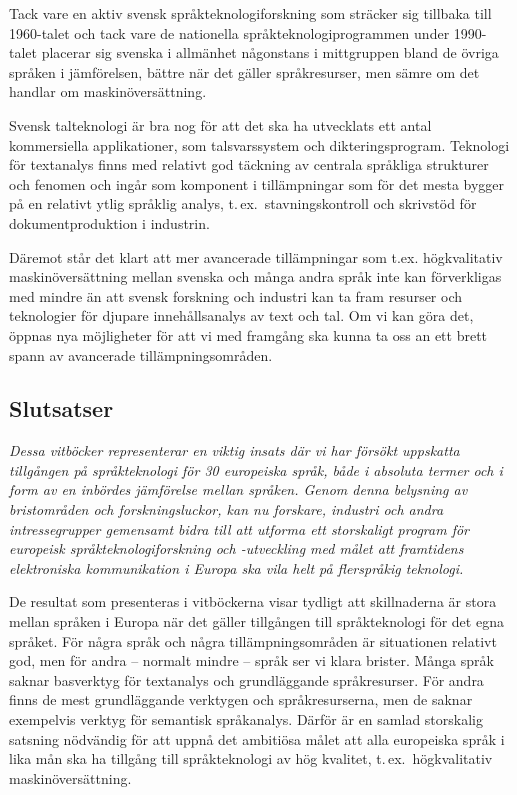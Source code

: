 \begin{multicols}{2}
Tack vare en aktiv svensk språkteknologiforskning som sträcker sig
tillbaka till 1960-talet och tack vare de nationella
språkteknologiprogrammen under 1990-talet placerar sig svenska i
allmänhet någonstans i mittgruppen bland de övriga språken i
jäm\-fö\-rel\-sen, bättre när det gäller språkresurser, men sämre om det
handlar om maskinöversättning.

Svensk talteknologi är bra nog för att det ska ha utvecklats ett antal
kommersiella applikationer, som talsvarssystem och
dikteringsprogram. Teknologi för textanalys finns med relativt god
täckning av centrala språkliga strukturer och fenomen och ingår som
komponent i tillämpningar som för det mesta bygger på en relativt
ytlig språklig analys, t.\,ex.~stavningskontroll och skrivstöd för
dokumentproduktion i industrin.

Däremot står det klart att mer avancerade tillämpningar som t.ex.
högkvalitativ maskinöversättning mellan svenska och många andra språk
inte kan förverkligas med mindre än att svensk forskning och industri
kan ta fram resurser och teknologier för djupare innehållsanalys av
text och tal. Om vi kan göra det, öppnas nya möjligheter för att vi
med framgång ska kunna ta oss an ett brett spann av avancerade
tillämpningsområden.


\subsection{Slutsatser}

\emph{Dessa vitböcker representerar en viktig insats där vi har
  försökt uppskatta tillgången på språkteknologi för 30 europeiska
  språk, både i absoluta termer och i form av en inbördes jäm\-förelse
  mellan språken. Genom denna belys\-ning av brist\-områden och
  forsknings\-luckor, kan nu forskare, industri och andra
  intresse\-grupper gemen\-samt bidra till att utforma ett
  stor\-skaligt program för europeisk språk\-tekno\-logi\-forsk\-ning
  och -utveckling med målet att framtidens elektroniska kommunikation
  i Europa ska vila helt på fler\-språkig teknologi.}

De resultat som presenteras i vitböckerna visar tydligt att
skillnaderna är stora mellan språken i Europa när det gäller
tillgången till språkteknologi för det egna språket. För några språk
och några tillämpningsområden är situationen relativt god, men för
andra -- normalt mindre -- språk ser vi klara brister. Många språk
saknar basverktyg för textanalys och grundläggande språkresurser. För
andra finns de mest grundläggande verktygen och språkresurserna, men
de saknar exempelvis verktyg för semantisk språkanalys. Därför är en
samlad storskalig satsning nödvändig för att uppnå det ambitiösa målet
att alla europeiska språk i lika mån ska ha tillgång till
språkteknologi av hög kvalitet, t.\,ex.~högkvalitativ
maskinöversättning.


\end{multicols}
